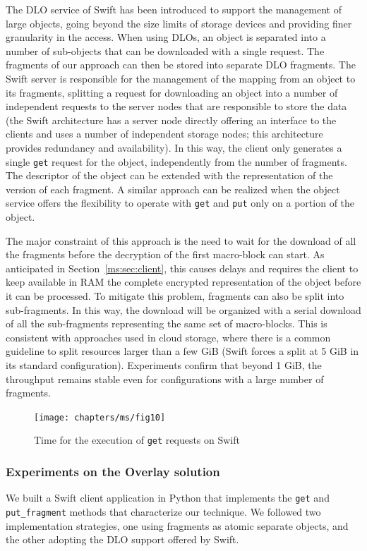 \medskip
{}  
The DLO service of Swift has been introduced to support the management of large objects, going beyond the size limits of storage devices and providing finer granularity in the access. When using DLOs, an object is separated into a number of sub-objects that can be downloaded with a single request. The fragments of our approach can then be stored into separate DLO fragments. The Swift server is responsible for the management of the mapping from an object to its fragments, splitting a request for downloading an object into a number of independent requests to the server nodes that are responsible to store the data (the Swift architecture has a server node directly offering an interface to the clients and uses a number of independent storage nodes; this architecture provides redundancy and availability). In this way, the client only generates a single {\tt get} request for the object, independently from the number of fragments. The descriptor of the object can be extended with the representation of the version of each fragment. A similar approach can be realized when the object service offers the flexibility to operate with {\tt get} and {\tt put} only on a portion of the object.

The major constraint of this approach is the need to wait for the download of all the fragments before the decryption of the first macro-block can start. As anticipated in Section~\ref{ms:sec:client}, this causes delays and requires the client to keep available in RAM the complete encrypted representation of the object before it can be processed. To mitigate this problem, fragments can also be split into sub-fragments. In this way, the download will be organized with a serial download of all the sub-fragments representing the same set of macro-blocks. This is consistent with approaches used in cloud storage, where there is a common guideline to split resources larger than a few GiB (Swift forces a split at 5 GiB in its standard configuration). Experiments confirm that beyond 1 GiB, the throughput remains stable even for configurations with a large number of fragments.

\begin{figure}[t]
\texttt{[image: chapters/ms/fig10]}
\caption{\label{ms:fig:getPlain}Time for the execution of {\tt get} requests on Swift}
\end{figure}

\subsubsection{Experiments on the Overlay solution}
We built a Swift client application in Python that implements the {\tt get} and {\tt put\_fragment} methods that characterize our technique. We followed two implementation strategies, one using fragments as atomic separate objects, and the other adopting the DLO support offered by Swift.

